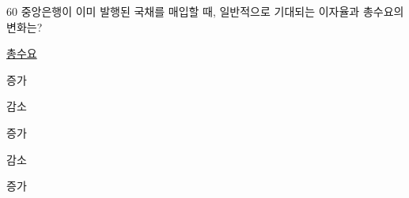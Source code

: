 \begin{question}{60}
중앙은행이 이미 발행된 국채를 매입할 때, 일반적으로 기대되는 이자율과 총수요의 변화는?

\noindent\hspace*{2em}\uline{총수요}\par
\begin{choices}
  \item {}증가
  \item {}감소
  \item {}증가
  \item {}감소
  \item {}증가
\end{choices}
\end{question}

